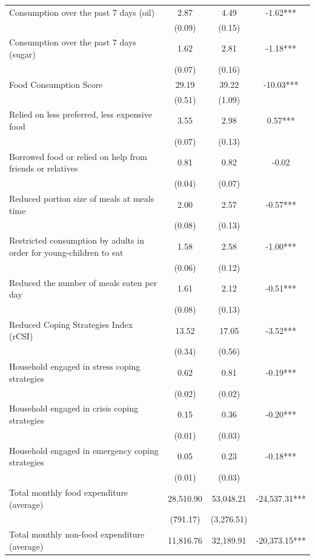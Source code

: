 \begin{tabular}{@{\extracolsep{5pt}}lccc}
Consumption over the past 7 days (oil)   & 2.87    & 4.49    & -1.62***   \\
 & (0.09)  & (0.15)  &  \\ [1ex]
Consumption over the past 7 days (sugar)   & 1.62    & 2.81    & -1.18***   \\
 & (0.07)  & (0.16)  &  \\ [1ex]
Food Consumption Score   & 29.19    & 39.22    & -10.03***   \\
 & (0.51)  & (1.09)  &  \\ [1ex]
Relied on less preferred, less expensive food   & 3.55    & 2.98    & 0.57***   \\
 & (0.07)  & (0.13)  &  \\ [1ex]
Borrowed food or relied on help from friends or relatives   & 0.81    & 0.82    & -0.02   \\
 & (0.04)  & (0.07)  &  \\ [1ex]
Reduced portion size of meals at meals time   & 2.00    & 2.57    & -0.57***   \\
 & (0.08)  & (0.13)  &  \\ [1ex]
Restricted consumption by adults in order for young-children to eat   & 1.58    & 2.58    & -1.00***   \\
 & (0.06)  & (0.12)  &  \\ [1ex]
Reduced the number of meals eaten per day   & 1.61    & 2.12    & -0.51***   \\
 & (0.08)  & (0.13)  &  \\ [1ex]
Reduced Coping Strategies Index (rCSI)   & 13.52    & 17.05    & -3.52***   \\
 & (0.34)  & (0.56)  &  \\ [1ex]
Household engaged in stress coping strategies   & 0.62    & 0.81    & -0.19***   \\
 & (0.02)  & (0.02)  &  \\ [1ex]
Household engaged in crisis coping strategies   & 0.15    & 0.36    & -0.20***   \\
 & (0.01)  & (0.03)  &  \\ [1ex]
Household engaged in emergency coping strategies   & 0.05    & 0.23    & -0.18***   \\
 & (0.01)  & (0.03)  &  \\ [1ex]
Total monthly food expenditure (average)   & 28,510.90    & 53,048.21    & -24,537.31***   \\
 & (791.17)  & (3,276.51)  &  \\ [1ex]
Total monthly non-food expenditure (average)   & 11,816.76    & 32,189.91    & -20,373.15***   \\

\end{tabular}
